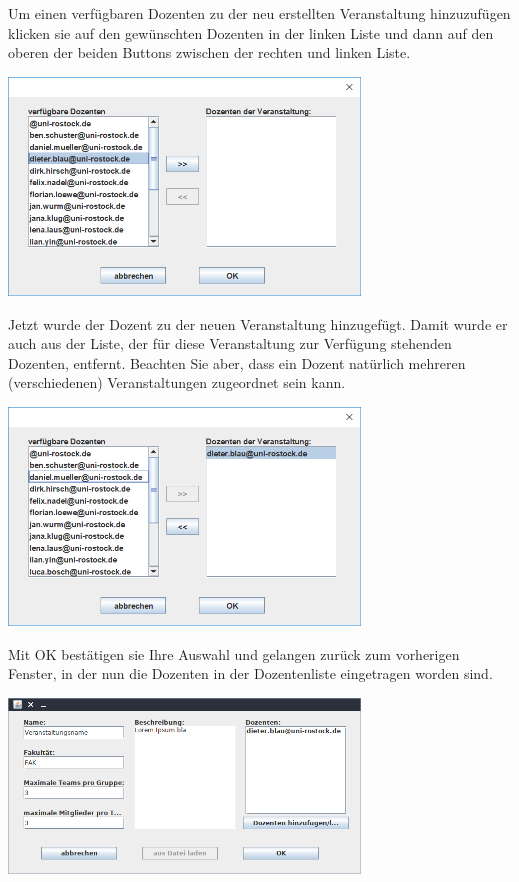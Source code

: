 \documentclass{Handbuch}
\begin{document}
Um einen verfügbaren Dozenten zu der neu erstellten Veranstaltung hinzuzufügen klicken sie auf den gewünschten Dozenten in der linken Liste und dann auf den oberen der beiden Buttons zwischen der rechten und linken Liste.
\begin{center}
	\includegraphics[width=0.7\textwidth]{img_adminGUI_05.png}
\end{center}
Jetzt wurde der Dozent zu der neuen Veranstaltung hinzugefügt. Damit wurde er auch aus der Liste, der für diese Veranstaltung zur Verfügung stehenden Dozenten, entfernt. Beachten Sie aber, dass ein Dozent natürlich mehreren (verschiedenen) Veranstaltungen zugeordnet sein kann.
\begin{center}
	\includegraphics[width=0.7\textwidth]{img_adminGUI_06.png}
\end{center}
Mit \frqq OK\flqq{} bestätigen sie Ihre Auswahl und gelangen zurück zum vorherigen Fenster, in der nun die Dozenten in der Dozentenliste eingetragen worden sind.
\begin{center}
	\includegraphics[width=0.7\textwidth]{img_adminGUI_07.png}
\end{center}
\end{document}

